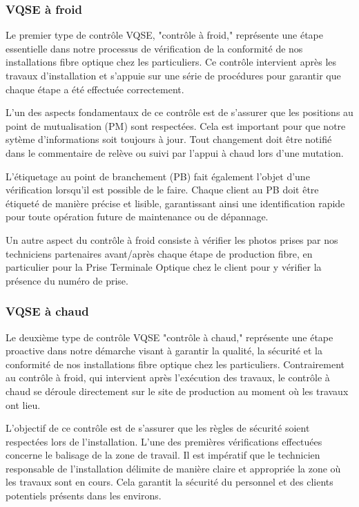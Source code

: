 \documentclass[12pt, a4paper]{article}
\begin{document}
\subsubsection{VQSE à froid}
Le premier type de contrôle VQSE,  "contrôle à froid,"
représente une étape essentielle dans notre
processus de vérification de la conformité de
nos installations fibre optique chez
les particuliers. Ce contrôle intervient
après les travaux d'installation et
s'appuie sur une série de procédures pour
garantir que chaque étape a été effectuée correctement.

L'un des aspects fondamentaux de ce
contrôle est de s'assurer que les positions
au point de mutualisation (PM) sont
respectées. Cela est important pour que notre sytème 
d'informations soit toujours à jour. Tout changement
doit être notifié dans le commentaire de relève 
ou suivi par l'appui à chaud lors d'une mutation.

L'étiquetage au point de branchement (PB) fait
également l'objet d'une vérification lorsqu'il
est possible de le faire. Chaque client au \gls{PB} doit
être étiqueté de manière précise et lisible,
garantissant ainsi une identification rapide
pour toute opération future de
maintenance ou de dépannage.

Un autre aspect du contrôle à froid
consiste à vérifier les photos prises
par nos techniciens partenaires avant/après
chaque étape de production fibre, en
particulier pour la Prise Terminale
Optique chez le client pour y vérifier
la présence du numéro de prise.  


\subsubsection{VQSE à chaud}
Le deuxième type de contrôle VQSE "contrôle à chaud,"
représente une étape proactive
dans notre démarche visant à garantir la qualité,
la sécurité et la conformité de nos installations
fibre optique chez les particuliers.
Contrairement au contrôle à froid, qui
intervient après l'exécution des travaux,
le contrôle à chaud se déroule directement
sur le site de production au moment où les
travaux ont lieu.

L'objectif de ce contrôle est
de s'assurer que les règles de sécurité
soient respectées lors de l'installation.
L'une des premières vérifications effectuées
concerne le balisage de la zone de travail.
Il est impératif que le technicien
responsable de l'installation délimite
de manière claire et appropriée la zone
où les travaux sont en cours. Cela garantit
la sécurité du personnel et des clients
potentiels présents dans les environs.
\newpage
\end{document}
